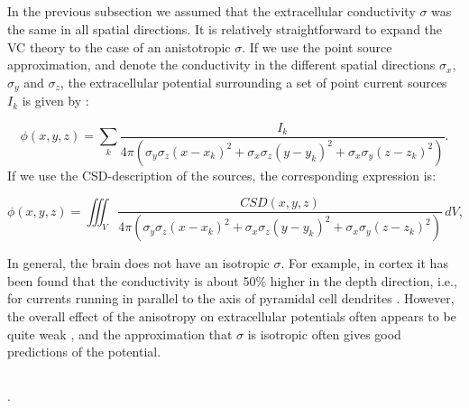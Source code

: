 \subsection{}
\label{sec:anisohomo}
In the previous subsection we assumed that the extracellular conductivity $\sigma$ was the same in all spatial directions. It is relatively straightforward to expand the VC theory to the case of an anistotropic $\sigma$. If we use the point source approximation, and denote the conductivity in the different spatial directions $\sigma_x$, $\sigma_y$ and $\sigma_z$, the extracellular potential surrounding a set of point current sources $I_k$ is given by \citep{nicholson1975, Pettersen2012}:

\begin{equation}
\phi(x,y,z) = \sum_k \frac{I_k}{4\pi(\sigma_y\sigma_z (x-x_k)^2 + \sigma_x\sigma_z (y-y_k)^2 + \sigma_x\sigma_y (z-z_k)^2)}.
\label{eq:Panisos}
\end{equation}
If we use the CSD-description of the sources, the corresponding expression is:

\begin{equation}
\phi(x,y,z) = \iiint_V \frac{CSD(x,y,z)}{4\pi(\sigma_y\sigma_z (x-x_k)^2 + \sigma_x\sigma_z (y-y_k)^2 + \sigma_x\sigma_y (z-z_k)^2)} \, dV, 
\label{eq:Canisos}
\end{equation}

In general, the brain does not have an isotropic $\sigma$. For example, in cortex it has been found that the conductivity is about 50\% higher in the depth direction, i.e., for currents running in parallel to the axis of pyramidal cell dendrites \citep{Goto2010}. However, the overall effect of the anisotropy on extracellular potentials often appears to be quite weak \citep{Ness2015}, and the approximation that $\sigma$ is isotropic often gives good predictions of the potential.


\subsection{}
\label{sec:nonhomo}
. 

